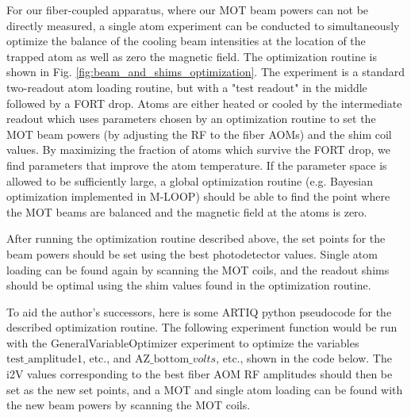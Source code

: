 For our fiber-coupled apparatus, where our MOT beam powers can not be directly measured, a single atom experiment can be conducted to simultaneously optimize the balance of the cooling beam intensities at the location of the trapped atom as well as zero the magnetic field. The optimization routine is shown in Fig. \ref{fig:beam_and_shims_optimization}. The experiment is a standard two-readout atom loading routine, but with a "test readout" in the middle followed by a FORT drop. Atoms are either heated or cooled by the intermediate readout which uses parameters chosen by an optimization routine to set the MOT beam powers (by adjusting the RF to the fiber AOMs) and the shim coil values. By maximizing the fraction of atoms which survive the FORT drop, we find parameters that improve the atom temperature. If the parameter space is allowed to be sufficiently large, a global optimization routine (e.g. Bayesian optimization implemented in M-LOOP) should be able to find the point where the MOT beams are balanced and the magnetic field at the atoms is zero.

After running the optimization routine described above, the set points for the beam powers should be set using the best photodetector values. Single atom loading can be found again by scanning the MOT coils, and the readout shims should be optimal using the shim values found in the optimization routine.

To aid the author's successors, here is some ARTIQ python pseudocode for the described optimization routine. The following experiment function would be run with the GeneralVariableOptimizer experiment to optimize the variables $\mathrm{test} \_ \mathrm{amplitude}1$, etc.,  and $\mathrm{AZ} \_ \mathrm{bottom} \_ volts$, etc., shown in the code below. The i2V values corresponding to the best fiber AOM RF amplitudes should then be set as the new set points, and a MOT and single atom loading can be found with the new beam powers by scanning the MOT coils.



